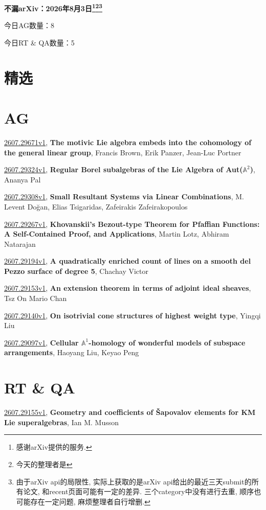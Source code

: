 \documentclass[9pt, a4paper]{article}
\theoremstyle{plain}
\theoremstyle{definition}
\theoremstyle{remark}
\newcommand{\arxiv}[3]{\href{https://arxiv.org/abs/#1}{#1}, \textbf{\textcolor{arxivblue}{#2}}, #3}
\newcommand{\AGnumber}{8}
\newcommand{\RTQAnumber}{5}
\newcommand{\NewestDate}{2026年8月3日}
\newcommand{\todayarXiver}{} %
\begin{document}
\begin{center}
    \Huge\textbf{不漏arXiv：\NewestDate\footnote{感谢arXiv提供的服务.}\footnote{今天的整理者是\todayarXiver}\footnote{由于arXiv api的局限性, 实际上获取的是arXiv api给出的最近三天submit的所有论文, 和recent页面可能有一定的差异. 三个category中没有进行去重, 顺序也可能存在一定问题, 麻烦整理者自行增删.}} \\
\end{center}

\setcounter{section}{-1}

\begin{center}
    今日AG数量：\AGnumber
    
    今日RT \& QA数量：\RTQAnumber
    
\end{center}


\section{精选}


\section{AG}
\arxiv{2607.29671v1}{The motivic Lie algebra embeds into the cohomology of the general linear group}{Francis Brown, Erik Panzer, Jean-Luc Portner}

\arxiv{2607.29324v1}{Regular Borel subalgebras of the Lie Algebra of Aut($\mathbb{A}^2$)}{Ananya Pal}

\arxiv{2607.29308v1}{Small Resultant Systems via Linear Combinations}{M. Levent Doğan, Elias Tsigaridas, Zafeirakis Zafeirakopoulos}

\arxiv{2607.29267v1}{Khovanskii's Bezout-type Theorem for Pfaffian Functions: A Self-Contained Proof, and Applications}{Martin Lotz, Abhiram Natarajan}

\arxiv{2607.29194v1}{A quadratically enriched count of lines on a smooth del Pezzo surface of degree 5}{Chachay Victor}

\arxiv{2607.29153v1}{An extension theorem in terms of adjoint ideal sheaves}{Tsz On Mario Chan}

\arxiv{2607.29140v1}{On isotrivial cone structures of highest weight type}{Yingqi Liu}

\arxiv{2607.29097v1}{Cellular $\mathbb{A}^1$-homology of wonderful models of subspace arrangements}{Haoyang Liu, Keyao Peng}


\section{RT \& QA}
\arxiv{2607.29155v1}{Geometry and coefficients of Šapovalov elements for KM Lie superalgebras}{Ian M. Musson}
\end{document}
